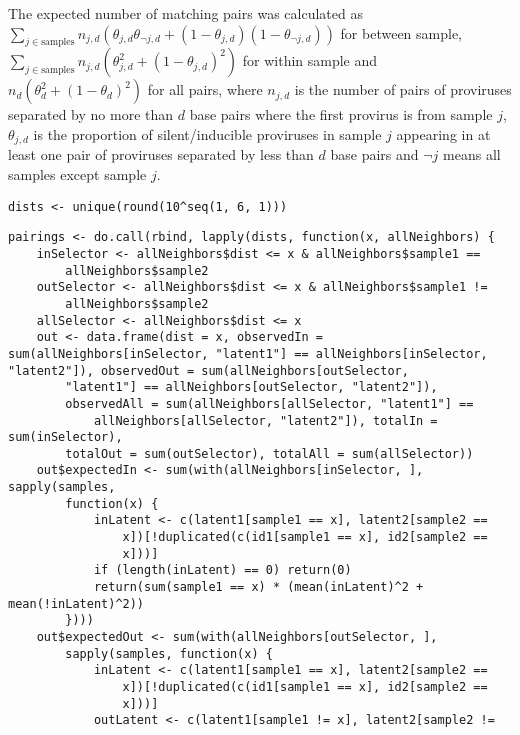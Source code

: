 \documentclass[../../sherrill-Mix_thesis.tex]{subfiles}
\makeatletter
\newenvironment{kframe}{%
 \def\at@end@of@kframe{}%
 \ifinner\ifhmode%
  \def\at@end@of@kframe{\end{minipage}}%
  \begin{minipage}{\columnwidth}%
 \fi\fi%
 \def\FrameCommand##1{\hskip\@totalleftmargin \hskip-\fboxsep
 \colorbox{shadecolor}{##1}\hskip-\fboxsep
     \hskip-\linewidth \hskip-\@totalleftmargin \hskip\columnwidth}%
 \MakeFramed {\advance\hsize-\width
   \@totalleftmargin\z@ \linewidth\hsize
   \@setminipage}}%
 {\par\unskip\endMakeFramed%
 \at@end@of@kframe}
\newenvironment{knitrout}{}{} %
\makeatother
\begin{document}
The expected number of matching pairs was calculated as \(\sum_{j \in \text{samples}} n_{j, d}(\theta_{j, d}\theta_{\neg j, d}+(1-\theta_{j, d})(1-\theta_{\neg j, d}))\) for between sample, \(\sum_{j \in \text{samples}} n_{j, d}(\theta_{j, d}^2+(1-\theta_{j, d})^2)\) for within sample and \(n_{d}(\theta_{d}^2+(1-\theta_{d})^2)\) for all pairs, where $n_{j, d}$ is the number of pairs of proviruses separated by no more than $d$ base pairs where the first provirus is from sample $j$, $\theta_{j, d}$ is the proportion of silent/inducible proviruses in sample $j$ appearing in at least one pair of proviruses separated by less than $d$ base pairs and $\neg j$ means all samples except sample $j$.
\begin{knitrout}
\color{fgcolor}\begin{kframe}
\begin{lstlisting}[basicstyle=\ttfamily,breaklines=true]
dists <- unique(round(10^seq(1, 6, 1)))\end{lstlisting}
\begin{lstlisting}[basicstyle=\ttfamily,breaklines=true]
pairings <- do.call(rbind, lapply(dists, function(x, allNeighbors) {
    inSelector <- allNeighbors$dist <= x & allNeighbors$sample1 == 
        allNeighbors$sample2
    outSelector <- allNeighbors$dist <= x & allNeighbors$sample1 != 
        allNeighbors$sample2
    allSelector <- allNeighbors$dist <= x
    out <- data.frame(dist = x, observedIn = sum(allNeighbors[inSelector, "latent1"] == allNeighbors[inSelector, "latent2"]), observedOut = sum(allNeighbors[outSelector, 
        "latent1"] == allNeighbors[outSelector, "latent2"]), 
        observedAll = sum(allNeighbors[allSelector, "latent1"] == 
            allNeighbors[allSelector, "latent2"]), totalIn = sum(inSelector), 
        totalOut = sum(outSelector), totalAll = sum(allSelector))
    out$expectedIn <- sum(with(allNeighbors[inSelector, ], sapply(samples, 
        function(x) {
            inLatent <- c(latent1[sample1 == x], latent2[sample2 == 
                x])[!duplicated(c(id1[sample1 == x], id2[sample2 == 
                x]))]
            if (length(inLatent) == 0) return(0)
            return(sum(sample1 == x) * (mean(inLatent)^2 + mean(!inLatent)^2))
        })))
    out$expectedOut <- sum(with(allNeighbors[outSelector, ], 
        sapply(samples, function(x) {
            inLatent <- c(latent1[sample1 == x], latent2[sample2 == 
                x])[!duplicated(c(id1[sample1 == x], id2[sample2 == 
                x]))]
            outLatent <- c(latent1[sample1 != x], latent2[sample2 != 

\end{lstlisting}
\end{kframe}
\end{knitrout}
\end{document}
